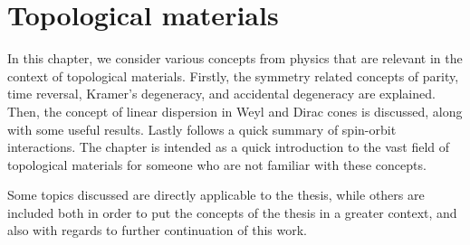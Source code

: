 \documentclass[
paper=B5,
]{scrbook}
\begin{document}
% 
\frontmatter
\tableofcontents

\mainmatter
\chapter{Topological materials}
In this chapter, we consider various concepts from physics that are relevant in the context of topological materials.
Firstly, the symmetry related concepts of parity, time reversal, Kramer's degeneracy, and accidental degeneracy are explained.
Then, the concept of linear dispersion in Weyl and Dirac cones is discussed, along with some useful results.
Lastly follows a quick summary of spin-orbit interactions.
The chapter is intended as a quick introduction to the vast field of topological materials for someone who are not familiar with these concepts.

Some topics discussed are directly applicable to the thesis, while others are included both in order to put the concepts of the thesis in a greater context, and also with regards to further continuation of this work.








% 

% 

% 
% 
% 
% 
\end{document}
